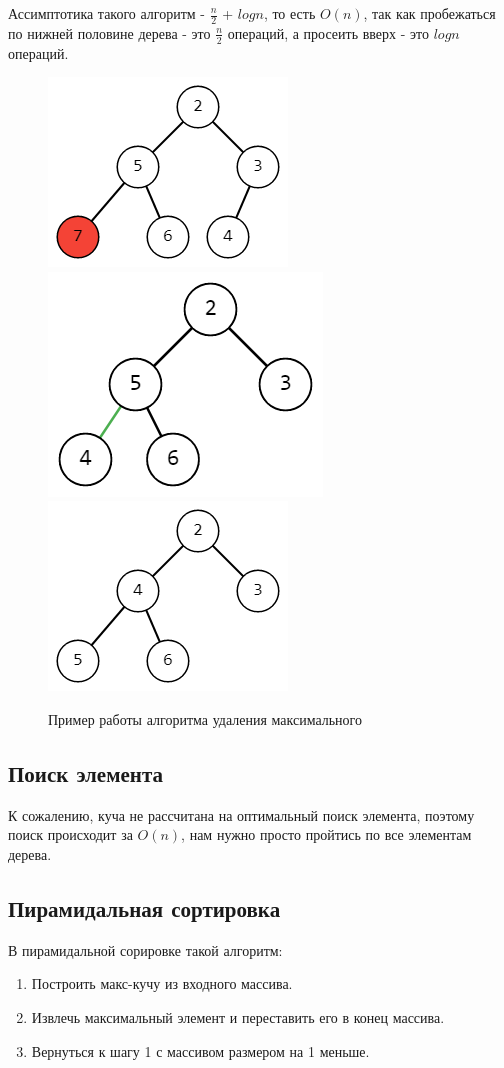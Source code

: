 \documentclass{article}
\begin{document}
Ассимптотика такого алгоритм - $\frac{n}{2}$ + $log n$, то есть $O(n)$, так как пробежаться по нижней половине дерева - это $\frac{n}{2}$ операций, а просеить вверх - это $log n$ операций.

\begin{figure}[h]
    \centering
    \includegraphics[width=0.3\linewidth]{9.png}
    \includegraphics[width=0.3\linewidth]{10.png}
    \includegraphics[width=0.3\linewidth]{11.png}
    \caption{Пример работы алгоритма удаления максимального}
    \label{fig:mpr}
\end{figure}

\newpage

\subsection{Поиск элемента}

К сожалению, куча не рассчитана на оптимальный поиск элемента, поэтому поиск происходит за $O(n)$, нам нужно просто пройтись по все элементам дерева.

\subsection{Пирамидальная сортировка}

В пирамидальной сорировке такой алгоритм:

\begin{enumerate}
    \item Построить макс-кучу из входного массива.
    \item Извлечь максимальный элемент и переставить его в конец массива.
    \item Вернуться к шагу 1 с массивом размером на 1 меньше.
\end{enumerate}
\end{document}
